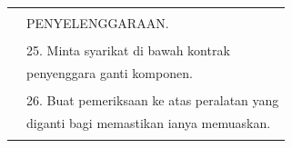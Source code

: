 \documentclass[
]{article}
\begin{document}
\begin{longtable}[]{@{}ll@{}}
\begin{minipage}[t]{0.71\columnwidth}
\end{minipage}\tabularnewline
\begin{minipage}[t]{0.23\columnwidth}\raggedright
\strut
\end{minipage} & \begin{minipage}[t]{0.71\columnwidth}\raggedright
PENYELENGGARAAN.\strut
\end{minipage}\tabularnewline
\begin{minipage}[t]{0.23\columnwidth}\raggedright
\strut
\end{minipage} & \begin{minipage}[t]{0.71\columnwidth}\raggedright
\strut
\end{minipage}\tabularnewline
\begin{minipage}[t]{0.23\columnwidth}\raggedright
\strut
\end{minipage} & \begin{minipage}[t]{0.71\columnwidth}\raggedright
25. Minta syarikat di bawah kontrak\strut
\end{minipage}\tabularnewline
\begin{minipage}[t]{0.23\columnwidth}\raggedright
\strut
\end{minipage} & \begin{minipage}[t]{0.71\columnwidth}\raggedright
penyenggara ganti komponen.\strut
\end{minipage}\tabularnewline
\begin{minipage}[t]{0.23\columnwidth}\raggedright
\strut
\end{minipage} & \begin{minipage}[t]{0.71\columnwidth}\raggedright
\strut
\end{minipage}\tabularnewline
\begin{minipage}[t]{0.23\columnwidth}\raggedright
\strut
\end{minipage} & \begin{minipage}[t]{0.71\columnwidth}\raggedright
26. Buat pemeriksaan ke atas peralatan yang\strut
\end{minipage}\tabularnewline
\begin{minipage}[t]{0.23\columnwidth}\raggedright
\strut
\end{minipage} & \begin{minipage}[t]{0.71\columnwidth}\raggedright
diganti bagi memastikan ianya memuaskan.\strut
\end{minipage}\tabularnewline
\begin{minipage}[t]{0.23\columnwidth}\raggedright
\strut
\end{minipage} & \begin{minipage}[t]{0.71\columnwidth}\raggedright

\end{minipage}
\end{longtable}
\end{document}
